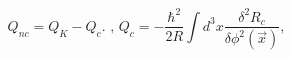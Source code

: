 \begin{equation}
Q_{nc}=Q_{K}-Q_{c}.\text{ \ \ ,\ \ \ }Q_{c}=-\frac{\hbar^{2}}{2R}\int
d^{3}x\frac{\delta^{2}R_{c}}{\delta\phi^{2}\left(  \vec{x}\right)
},\label{7.3}%
\end{equation}

